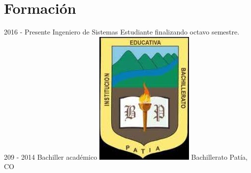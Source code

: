 \documentclass[american]{cv-class}
\begin{document}
\section{Formación}
\begin{entrylist}
	\entry
	{2016 - Presente}
	{Ingeniero de Sistemas }
	{ }
	{\justifying Estudiante finalizando octavo semestre.
	}
	\\
	\entry
	{209 - 2014}
	{Bachiller académico }
	{ \raisebox{-1.5ex} {\includegraphics[scale=0.05]{img/institutions/colegioLogo.jpeg} Bachillerato Patía, CO}}
	{\justifying 
	}
	\end{entrylist}
\end{document}

